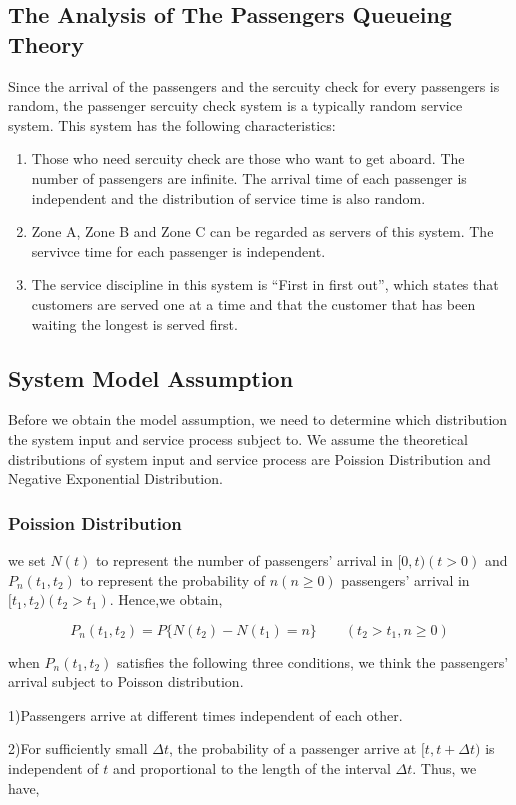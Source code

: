 \documentclass{mcmthesis}
\begin{document}
\subsection{The Analysis of The Passengers Queueing Theory}%
		Since the arrival of the passengers and the sercuity check for every passengers is random, the passenger sercuity check system is a typically random service system. This system has the following characteristics:
			\begin {enumerate}
				\item Those who need sercuity check are those who want to get aboard. The number of passengers are infinite. The arrival time of each passenger is independent and the distribution of service time is also random.
				\item Zone A, Zone B and Zone C can be regarded as servers of this system. The servivce time for each passenger is independent.
				\item The service discipline in this system is ``First in first out'', which states that customers are served one at a time and that the customer that has been waiting the longest is served first.
			\end{enumerate}
\subsection{System Model Assumption}%
Before we obtain the model assumption, we need to determine which distribution the system input and service process subject to. We assume the theoretical distributions of system input and service process are Poission Distribution and Negative Exponential Distribution.
\subsubsection{ Poission  Distribution}
we set $ N(t) $ to represent the number of passengers'  arrival in $ [0,t)(t>0) $ and $ P_n(t_1,t_2) $
to represent the probability of $ n(n\geqslant 0) $ passengers'  arrival  in $ [t_1,t_2)(t_2>t_1) $. Hence,we obtain,

\begin{equation}
P_n(t_1,t_2)=P\{  N(t_2)-N(t_1) =n \} \qquad (t_2>t_1,n\geqslant 0)
\end{equation}

when $P_n(t_1,t_2)$ satisfies the following three conditions, we think the passengers'  arrival subject to Poisson distribution.
\par 1)Passengers arrive at different times independent of each other.
\par 2)For sufficiently small $\Delta t$, the probability of a passenger arrive at $[t,t+\Delta t)$ is independent of $t$ and proportional to the length of the interval  $\Delta t$.
Thus, we have,
\end{document}
